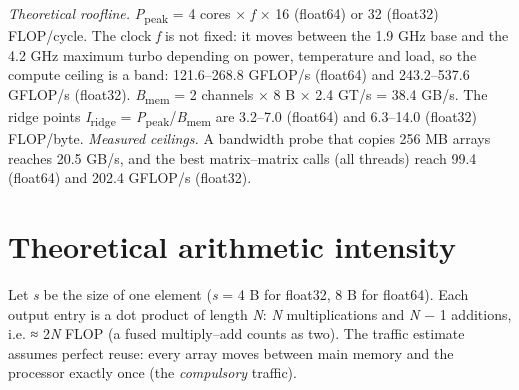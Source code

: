 \documentclass[10pt,a4paper]{article}
\begin{document}
\emph{Theoretical roofline.} \emph{P}\textsubscript{peak} = 4 cores × \emph{f} × 16 (float64) or 32 (float32) FLOP/cycle. The clock \emph{f} is not fixed: it moves between the 1.9 GHz base and the 4.2 GHz maximum turbo depending on power, temperature and load, so the compute ceiling is a band: 121.6–268.8 GFLOP/s (float64) and 243.2–537.6 GFLOP/s (float32). \emph{B}\textsubscript{mem} = 2 channels × 8 B × 2.4 GT/s = 38.4 GB/s. The ridge points \emph{I}\textsubscript{ridge} = \emph{P}\textsubscript{peak}/\emph{B}\textsubscript{mem} are 3.2–7.0 (float64) and 6.3–14.0 (float32) FLOP/byte. \emph{Measured ceilings.} A bandwidth probe that copies 256 MB arrays reaches 20.5 GB/s, and the best matrix–matrix calls (all threads) reach 99.4 (float64) and 202.4 GFLOP/s (float32).

\section{Theoretical arithmetic intensity}
Let \emph{s} be the size of one element (\emph{s} = 4 B for float32, 8 B for float64). Each output entry is a dot product of length \emph{N}: \emph{N} multiplications and \emph{N} − 1 additions, i.e. ≈ 2\emph{N} FLOP (a fused multiply–add counts as two). The traffic estimate assumes perfect reuse: every array moves between main memory and the processor exactly once (the \emph{compulsory} traffic).
\end{document}
